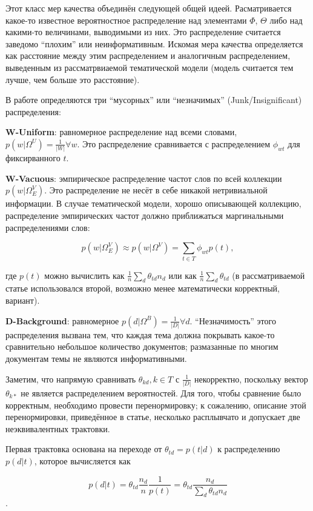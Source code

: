 Этот класс мер качества объединён следующей общей идеей. Расматривается какое-то известное вероятностное распределение над элементами $\Phi$, $\Theta$ либо над какими-то величинами, выводимыми из них. Это распределение считается заведомо ``плохим'' или неинформативным. Искомая мера качества определяется как расстояние между этим распределением и аналогичным распределением, выведенным из рассматрвиаемой тематической модели (модель считается тем лучше, чем больше это расстояние).

В работе \cite{alsumait2009topic} определяются три ``мусорных'' или ``незначимых'' (Junk/Insignificant) распределения:

\textbf{W-Uniform}: равномерное распределение над всеми словами, $p(w|\Omega^U) = \frac{1}{|W|} \forall w$. Это распределение сравнивается с распределением $\phi_{wt}$ для фиксирванного $t$.

\textbf{W-Vacuous}: эмпирическое распределение частот слов по всей коллекции $p(w|\Omega^V_E)$. Это распределение не несёт в себе никакой нетривиальной информации. В случае тематической модели, хорошо описывающей коллекцию, распределение эмпирических частот должно приближаться маргинальными распределениями слов: 

$$p(w|\Omega^V_E) \approx p(w|\Omega^V) = \sum_{t \in T} \phi_{wt}p(t), $$

где $p(t)$ можно вычислить как $\frac{1}{n}\sum_d \theta_{td} n_d$ или как $\frac{1}{n}\sum_d \theta_{td}$ (в рассматриваемой статье использовался второй, возможно менее математически корректный, вариант).

\textbf{D-Background}: равномерное $p(d|\Omega^B) = \frac{1}{|D|} \forall d$. ``Незначимость'' этого распределения вызвана тем, что каждая тема должна покрывать какое-то сравнительно небольшое количество документов; размазанные по многим документам темы не являются информативными. 

Заметим, что напрямую сравнивать $\theta_{k d}, k \in T$ с $\frac{1}{|D|}$ некорректно, поскольку вектор $\theta_{k \ast}$ не является распределением вероятностей. Для того, чтобы сравнение было корректным, необходимо провести перенормировку; к сожалению, описание этой перенормировки, приведённое в статье, несколько расплывчато и допускает две неэквивалентных трактовки.

Первая трактовка основана на переходе от $\theta_{td} = p(t|d)$ к распределению $p(d|t)$, которое вычисляется как 

$$p(d|t) = \theta_{td} \frac{n_d}{n} \frac{1}{p(t)} = \theta_{td} \frac{n_d}{\sum_d \theta_{td} n_d}$$.

